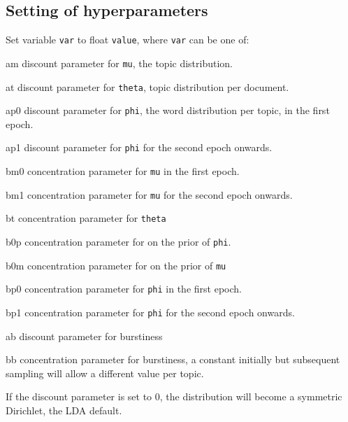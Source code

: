 \documentclass[a4paper,english]{article}
\begin{document}
\subsection{Setting of hyperparameters}
\begin{Description}\setlength{\itemsep}{0cm}
\item[\OptArg{-S}{var=value}]  Set variable \texttt{var} to float \texttt{value},
where \texttt{var} can be one of:
\begin{Description}[bdk]
\item[am] discount parameter for 
\texttt{mu}, the topic distribution.
\item[at] discount parameter for 
\texttt{theta}, topic distribution per document.
\item[ap0] discount parameter for 
\texttt{phi}, the word distribution per topic, in the first epoch.
\item[ap1] discount parameter for 
\texttt{phi} for the second epoch onwards.

\item[bm0] concentration parameter for 
\texttt{mu} in the first epoch.
\item[bm1] concentration parameter for
\texttt{mu} for the second epoch onwards.
\item[bt] concentration parameter for 
\texttt{theta}
\item[b0p] concentration parameter for
  on the prior of \texttt{phi}.
\item[b0m] concentration parameter for
on the prior of \texttt{mu}
\item[bp0] concentration parameter for
  \texttt{phi} in the first epoch.
\item[bp1] concentration parameter for
  \texttt{phi} for the second epoch onwards.

\item[ab] discount parameter for burstiness
\item[bb] concentration parameter for burstiness, a constant initially
     but subsequent sampling will allow a different value per topic.


\end{Description}
If the discount parameter is set to 0, the distribution will become a symmetric Dirichlet, the LDA default.
\end{Description}
\end{document}
